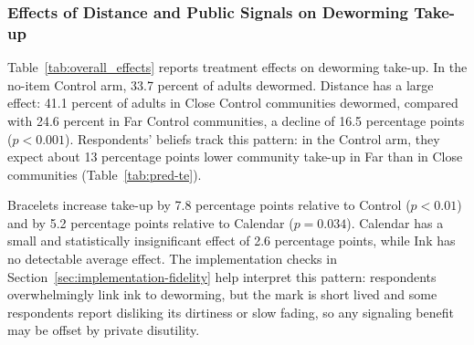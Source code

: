 \documentclass[ECM\space ReStud.tex]{subfiles}
\begin{document}
\begin{table}[ht!]
\scriptsize
\caption{Effects of Item/Signal Arms and Distance on the Observability of Deworming}
\label{tab:beliefs-visibility}
\centering
\begin{threeparttable}
\resizebox{\textwidth}{!}{%

}
\end{threeparttable}
\end{table}


\subsubsection{Effects of Distance and Public Signals on Deworming Take-up}

Table~\ref{tab:overall_effects} reports treatment effects on deworming take-up. In the no-item Control arm, 33.7 percent of adults dewormed. Distance has a large effect: 41.1 percent of adults in Close Control communities dewormed, compared with 24.6 percent in Far Control communities, a decline of 16.5 percentage points (\(p<0.001\)). Respondents' beliefs track this pattern: in the Control arm, they expect about 13 percentage points lower community take-up in Far than in Close communities (Table~\ref{tab:pred-te}).

Bracelets increase take-up by 7.8 percentage points relative to Control (\(p<0.01\)) and by 5.2 percentage points relative to Calendar (\(p=0.034\)). Calendar has a small and statistically insignificant effect of 2.6 percentage points, while Ink has no detectable average effect. The implementation checks in Section~\ref{sec:implementation-fidelity} help interpret this pattern: respondents overwhelmingly link ink to deworming, but the mark is short lived and some respondents report disliking its dirtiness or slow fading, so any signaling benefit may be offset by private disutility.
\end{document}
